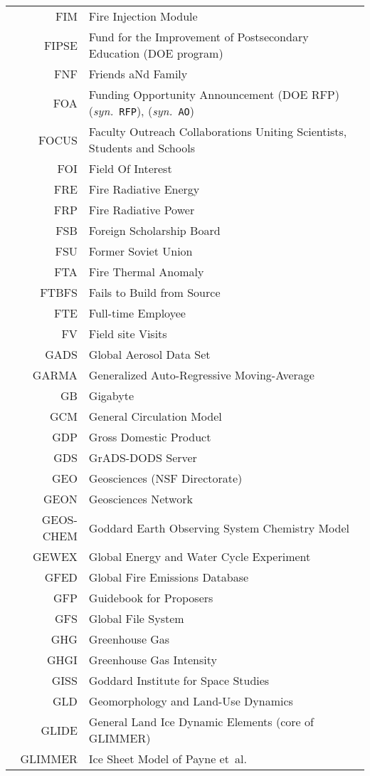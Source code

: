 \documentclass[12pt,twoside]{article}
\newcommand{\syn}[1]{(\textit{syn.}~\texttt{#1})}
\begin{document}
\begin{longtable}[>{\bfseries}l]{>{\ttfamily}r l}
FIM & Fire Injection Module \\
FIPSE & Fund for the Improvement of Postsecondary Education (DOE program) \\
FNF & Friends aNd Family \\
FOA & Funding Opportunity Announcement (DOE RFP) \syn{RFP}, \syn{AO} \\
FOCUS & Faculty Outreach Collaborations Uniting Scientists, Students and Schools \\
FOI & Field Of Interest \\
FRE & Fire Radiative Energy \\
FRP & Fire Radiative Power \\
FSB & Foreign Scholarship Board \\
FSU & Former Soviet Union \\
FTA & Fire Thermal Anomaly \\
FTBFS & Fails to Build from Source \\
FTE & Full-time Employee \\
FV & Field site Visits \\
GADS & Global Aerosol Data Set \\
GARMA & Generalized Auto-Regressive Moving-Average \\
GB & Gigabyte \\
GCM & General Circulation Model \\
GDP & Gross Domestic Product \\
GDS & GrADS-DODS Server \\
GEO & Geosciences (NSF Directorate) \\
GEON & Geosciences Network \\
GEOS-CHEM & Goddard Earth Observing System Chemistry Model \\
GEWEX & Global Energy and Water Cycle Experiment \\
GFED & Global Fire Emissions Database \\
GFP & Guidebook for Proposers \\
GFS & Global File System \\
GHG & Greenhouse Gas \\
GHGI & Greenhouse Gas Intensity \\
GISS & Goddard Institute for Space Studies \\
GLD & Geomorphology and Land-Use Dynamics \\
GLIDE & General Land Ice Dynamic Elements (core of GLIMMER) \\
GLIMMER & Ice Sheet Model of Payne et~al. \\

\end{longtable}
\end{document}

